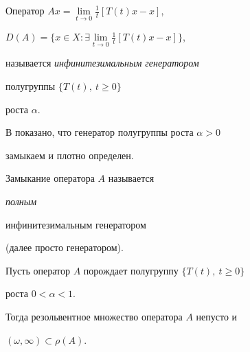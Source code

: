 \begin{defn}


Оператор $Ax=\lim\limits_{t\to 0}\frac{1}{t}[T(t)x-x]$,


$D(A)=\{x\in X: \exists \lim\limits_{t\to 0}\frac{1}{t}[T(t)x-x]\}$,


называется {\it инфинитезимальным генератором}


полугруппы $\{T(t),\ t\geq0 \}$


роста $\alpha$. 


\end{defn}





В \cite{Okazawa} показано, что генератор полугруппы роста $\alpha>0$


замыкаем и плотно определен.


Замыкание оператора $A$ называется {\it полным


инфинитезимальным генератором} (далее просто генератором).





\begin{lem}\label{14}


Пусть оператор $A$ порождает  полугруппу $\{T(t),\ t\geq0\}$


роста $0<\alpha<1$.


Тогда резольвентное множество оператора $A$ непусто и


$(\omega,\infty)\subset \rho(A)$.


\end{lem}






